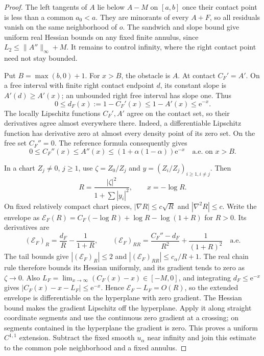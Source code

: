 \begin{proof}
The left tangents of $A$ lie below $A-M$ on $[a,b]$ once their contact point is less than a common $a_0<a$. They are minorants of every $A+F$, so all residuals vanish on the same neighborhood of $o$. The sandwich and slope bound give uniform real Hessian bounds on any fixed finite annulus, since $L_2\leq\|A''\|_\infty+M$. It remains to control infinity, where the right contact point need not stay bounded.

Put $B=\max(b,0)+1$. For $x>B$, the obstacle is $A$. At contact $C_F'=A'$. On a free interval with finite right contact endpoint $d$, its constant slope is $A'(d)\geq A'(x)$; an unbounded right free interval has slope one. Thus
\[
 0\leq d_F(x):=1-C_F'(x)\leq1-A'(x)\leq\mathrm e^{-x}.
\]
The locally Lipschitz functions $C_F',A'$ agree on the contact set, so their derivatives agree almost everywhere there. Indeed, a differentiable Lipschitz function has derivative zero at almost every density point of its zero set. On the free set $C_F''=0$. The reference formula consequently gives
\begin{equation}\label{eq:singular-radial-weighted-tail}
 0\leq C_F''(x)\leq A''(x)
 \leq(1+\alpha(1-\alpha))\mathrm e^{-x}
 \quad\text{a.e. on }x>B.
\end{equation}

In a chart $Z_j\ne0$, $j\geq1$, use $\zeta=Z_0/Z_j$ and $y=(Z_i/Z_j)_{i\geq1,i\ne j}$. Then
\[
 R=\frac{|\zeta|^2}{1+\sum|y_i|^2},\qquad x=-\log R.
\]
On fixed relatively compact chart pieces, $|\nabla R|\leq c\sqrt R$ and $|\nabla^2R|\leq c$. Write the envelope as
$\mathcal E_F(R)=C_F(-\log R)+\log R-\log(1+R)$ for $R>0$. Its derivatives are
\[
 (\mathcal E_F)_R=\frac{d_F}{R}-\frac1{1+R},\qquad
 (\mathcal E_F)_{RR}=\frac{C_F''-d_F}{R^2}+\frac1{(1+R)^2}
 \quad\text{a.e.}
\]
The tail bounds give $|(\mathcal E_F)_R|\leq2$ and
$|(\mathcal E_F)_{RR}|\leq c_\alpha/R+1$. The real chain rule therefore bounds its Hessian uniformly, and its gradient tends to zero as $\zeta\to0$. Also $L_F=\lim_{x\to\infty}(C_F(x)-x)\in[-M,0]$, and integrating $d_F\leq\mathrm e^{-x}$ gives
$|C_F(x)-x-L_F|\leq\mathrm e^{-x}$. Hence $\mathcal E_F-L_F=O(R)$, so the extended envelope is differentiable on the hyperplane with zero gradient. The Hessian bound makes the gradient Lipschitz off the hyperplane. Apply it along straight coordinate segments and use the continuous zero gradient at a crossing; on segments contained in the hyperplane the gradient is zero. This proves a uniform $C^{1,1}$ extension. Subtract the fixed smooth $u_\alpha$ near infinity and join this estimate to the common pole neighborhood and a fixed annulus.


\end{proof}
